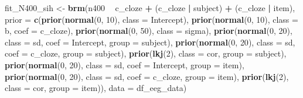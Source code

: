 \documentclass[12pt,]{krantz}
\newenvironment{Shaded}{\begin{snugshade}}{\end{snugshade}}
\newcommand{\DataTypeTok}[1]{\textcolor[rgb]{0.13,0.29,0.53}{#1}}
\newcommand{\DecValTok}[1]{\textcolor[rgb]{0.00,0.00,0.81}{#1}}
\newcommand{\KeywordTok}[1]{\textcolor[rgb]{0.13,0.29,0.53}{\textbf{#1}}}
\newcommand{\NormalTok}[1]{#1}
\newcommand{\OperatorTok}[1]{\textcolor[rgb]{0.81,0.36,0.00}{\textbf{#1}}}
\newcommand{\StringTok}[1]{\textcolor[rgb]{0.31,0.60,0.02}{#1}}
\theoremstyle{definition}
\theoremstyle{definition}
\theoremstyle{definition}
\theoremstyle{remark}
\begin{document}
\begin{Shaded}
\begin{Highlighting}[]
\NormalTok{fit_N400_sih <-}\StringTok{ }\KeywordTok{brm}\NormalTok{(n400 }\OperatorTok{~}\StringTok{ }\NormalTok{c_cloze }\OperatorTok{+}\StringTok{ }\NormalTok{(c_cloze }\OperatorTok{|}\StringTok{ }\NormalTok{subject) }\OperatorTok{+}\StringTok{ }\NormalTok{(c_cloze }\OperatorTok{|}\StringTok{ }\NormalTok{item),}
                  \DataTypeTok{prior =}
                      \KeywordTok{c}\NormalTok{(}\KeywordTok{prior}\NormalTok{(}\KeywordTok{normal}\NormalTok{(}\DecValTok{0}\NormalTok{, }\DecValTok{10}\NormalTok{), }\DataTypeTok{class =}\NormalTok{ Intercept),}
                        \KeywordTok{prior}\NormalTok{(}\KeywordTok{normal}\NormalTok{(}\DecValTok{0}\NormalTok{, }\DecValTok{10}\NormalTok{), }\DataTypeTok{class =}\NormalTok{ b, }\DataTypeTok{coef =}\NormalTok{ c_cloze),}
                        \KeywordTok{prior}\NormalTok{(}\KeywordTok{normal}\NormalTok{(}\DecValTok{0}\NormalTok{, }\DecValTok{50}\NormalTok{), }\DataTypeTok{class =}\NormalTok{ sigma),}
                        \KeywordTok{prior}\NormalTok{(}\KeywordTok{normal}\NormalTok{(}\DecValTok{0}\NormalTok{, }\DecValTok{20}\NormalTok{), }\DataTypeTok{class =}\NormalTok{ sd, }\DataTypeTok{coef =}\NormalTok{ Intercept, }\DataTypeTok{group =}\NormalTok{ subject),}
                        \KeywordTok{prior}\NormalTok{(}\KeywordTok{normal}\NormalTok{(}\DecValTok{0}\NormalTok{, }\DecValTok{20}\NormalTok{), }\DataTypeTok{class =}\NormalTok{ sd, }\DataTypeTok{coef =}\NormalTok{ c_cloze, }\DataTypeTok{group =}\NormalTok{ subject),}
                        \KeywordTok{prior}\NormalTok{(}\KeywordTok{lkj}\NormalTok{(}\DecValTok{2}\NormalTok{), }\DataTypeTok{class =}\NormalTok{ cor, }\DataTypeTok{group =}\NormalTok{ subject),}
                        \KeywordTok{prior}\NormalTok{(}\KeywordTok{normal}\NormalTok{(}\DecValTok{0}\NormalTok{, }\DecValTok{20}\NormalTok{), }\DataTypeTok{class =}\NormalTok{ sd, }\DataTypeTok{coef =}\NormalTok{ Intercept, }\DataTypeTok{group =}\NormalTok{ item),}
                        \KeywordTok{prior}\NormalTok{(}\KeywordTok{normal}\NormalTok{(}\DecValTok{0}\NormalTok{, }\DecValTok{20}\NormalTok{), }\DataTypeTok{class =}\NormalTok{ sd, }\DataTypeTok{coef =}\NormalTok{ c_cloze, }\DataTypeTok{group =}\NormalTok{ item),}
                        \KeywordTok{prior}\NormalTok{(}\KeywordTok{lkj}\NormalTok{(}\DecValTok{2}\NormalTok{), }\DataTypeTok{class =}\NormalTok{ cor, }\DataTypeTok{group =}\NormalTok{ item)),}
                  \DataTypeTok{data =}\NormalTok{ df_eeg_data)}
\end{Highlighting}
\end{Shaded}
\end{document}
